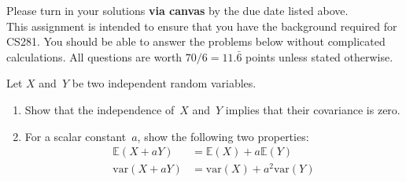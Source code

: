 \documentclass[submit]{harvardml}
\newcommand{\E}{\mathbb{E}}
\newcommand{\var}{\text{var}}
\begin{document}
\noindent Please turn in your solutions \textbf{via canvas} by the due date listed above.
\\

\noindent This assignment is intended to ensure that you have the background required for CS281. You should be able to answer the problems below without complicated calculations. All questions are worth $70/6 = 11.\bar{6}$ points unless stated otherwise.

\begin{problem}
Let $X$ and~$Y$ be two independent random variables.

\begin{enumerate}[label=(\alph*)]
\item Show that the independence of~$X$ and~$Y$ implies that their
covariance is zero.

\item For a scalar constant~$a$, show the following two properties:
\begin{align*}
  \E(X + aY) &= \E(X) + a\E(Y)\\
  \var(X + aY) &= \var(X) + a^2\var(Y)
\end{align*}
\end{enumerate}
\end{problem}
\end{document}
